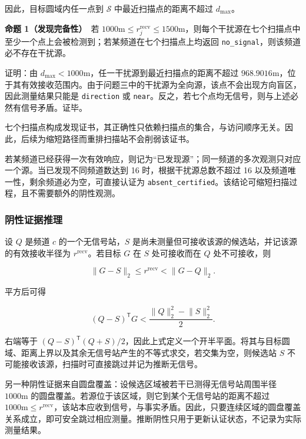 因此，目标圆域内任一点到 $\mathcal S$ 中最近扫描点的距离不超过 $d_{\max}$。

\textbf{命题 1（发现完备性）}　若 $1000\mathrm{m}\le r_j^{\mathrm{recv}}\le1500\mathrm{m}$，则每个干扰源在七个扫描点中至少一个点上会被检测到；若某频道在七个扫描点上均返回 \texttt{no\_signal}，则该频道必不存在干扰源。

证明：由 $d_{\max}<1000\mathrm{m}$，任一干扰源到最近扫描点的距离不超过 $968.9016\mathrm{m}$，位于其有效接收范围内。由于问题三中的干扰源为全向源，该点不会出现方向盲区，因此测量结果只能是 \texttt{direction} 或 \texttt{near}。反之，若七个点均无信号，则与上述必然有信号矛盾。证毕。

七个扫描点构成发现证书，其正确性只依赖扫描点的集合，与访问顺序无关。因此，后续为缩短路径而重排扫描站不会削弱该证书。

若某频道已经获得一次有效响应，则记为“已发现源”；同一频道的多次观测只对应一个源。当已发现不同频道数达到 16 时，根据干扰源总数不超过 16 以及频道唯一性，剩余频道必为空，可直接认证为 \texttt{absent\_certified}。该结论可缩短扫描过程，且不需要额外的阴性观测。

\subsubsection{阴性证据推理}

设 $Q$ 是频道 $c$ 的一个无信号站，$S$ 是尚未测量但可接收该源的候选站，并记该源的有效接收半径为 $r^{\mathrm{recv}}$。若目标 $G$ 在 $S$ 处可接收而在 $Q$ 处不可接收，则

\begin{equation}
\lVert G-S\rVert_2\le r^{\mathrm{recv}}<\lVert G-Q\rVert_2.
\label{eq:q3_negative_order}
\end{equation}

平方后可得

\begin{equation}
(Q-S)^{\mathsf T}G
<
\frac{\lVert Q\rVert_2^2-\lVert S\rVert_2^2}{2}.
\label{eq:q3_negative_halfplane}
\end{equation}

右端等于 $(Q-S)^{\mathsf T}(Q+S)/2$，因此上式定义一个开半平面。将其与目标圆域、距离上界以及其余无信号站产生的不等式求交，若交集为空，则候选站 $S$ 不可能接收该源，扫描时可直接跳过并记为推断无信号。

另一种阴性证据来自圆盘覆盖：设候选区域被若干已测得无信号站周围半径 $1000\mathrm{m}$ 的圆盘覆盖。若源位于该区域，则它到某个无信号站的距离不超过 $1000\mathrm{m}\le r^{\mathrm{recv}}$，该站本应收到信号，与事实矛盾。因此，只要连续区域的圆盘覆盖关系成立，即可安全跳过相应测量。推断阴性只用于更新认证状态，不记录为实际测量结果。

